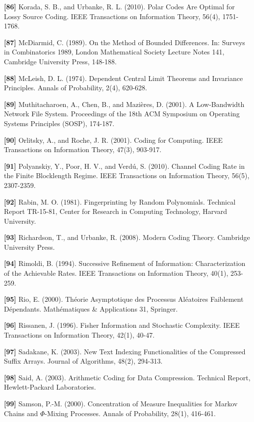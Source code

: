 \documentclass[
]{article}
\begin{document}
\textbf{{[}86{]}} Korada, S. B., and Urbanke, R. L. (2010). Polar
Codes Are Optimal for Lossy Source Coding. IEEE Transactions on
Information Theory, 56(4), 1751-1768.

\textbf{{[}87{]}} McDiarmid, C. (1989). On the Method of Bounded
Differences. In: Surveys in Combinatorics 1989, London Mathematical
Society Lecture Notes 141, Cambridge University Press, 148-188.

\textbf{{[}88{]}} McLeish, D. L. (1974). Dependent Central Limit
Theorems and Invariance Principles. Annals of Probability, 2(4),
620-628.

\textbf{{[}89{]}} Muthitacharoen, A., Chen, B., and Mazi\`eres, D.
(2001). A Low-Bandwidth Network File System. Proceedings of the 18th
ACM Symposium on Operating Systems Principles (SOSP), 174-187.

\textbf{{[}90{]}} Orlitsky, A., and Roche, J. R. (2001). Coding for
Computing. IEEE Transactions on Information Theory, 47(3), 903-917.

\textbf{{[}91{]}} Polyanskiy, Y., Poor, H. V., and Verd\'u, S. (2010).
Channel Coding Rate in the Finite Blocklength Regime. IEEE Transactions
on Information Theory, 56(5), 2307-2359.

\textbf{{[}92{]}} Rabin, M. O. (1981). Fingerprinting by Random
Polynomials. Technical Report TR-15-81, Center for Research in Computing
Technology, Harvard University.

\textbf{{[}93{]}} Richardson, T., and Urbanke, R. (2008). Modern Coding
Theory. Cambridge University Press.

\textbf{{[}94{]}} Rimoldi, B. (1994). Successive Refinement of
Information: Characterization of the Achievable Rates. IEEE Transactions
on Information Theory, 40(1), 253-259.

\textbf{{[}95{]}} Rio, E. (2000). Th\'eorie Asymptotique des Processus
Al\'eatoires Faiblement D\'ependants. Math\'ematiques \& Applications 31,
Springer.

\textbf{{[}96{]}} Rissanen, J. (1996). Fisher Information and
Stochastic Complexity. IEEE Transactions on Information Theory, 42(1),
40-47.

\textbf{{[}97{]}} Sadakane, K. (2003). New Text Indexing Functionalities
of the Compressed Suffix Arrays. Journal of Algorithms, 48(2), 294-313.

\textbf{{[}98{]}} Said, A. (2003). Arithmetic Coding for Data
Compression. Technical Report, Hewlett-Packard Laboratories.

\textbf{{[}99{]}} Samson, P.-M. (2000). Concentration of Measure
Inequalities for Markov Chains and $\Phi$-Mixing Processes. Annals of
Probability, 28(1), 416-461.
\end{document}
